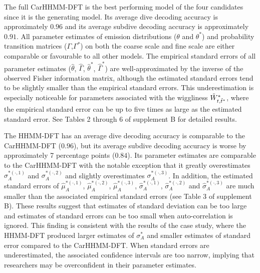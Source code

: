The full CarHHMM-DFT is the best performing model of the four candidates since it is the generating model. Its average dive decoding accuracy is approximately $0.96$ and its average subdive decoding accuracy is approximately $0.91$. 
All parameter estimates of emission distributions ($\theta$ and $\theta^*$) and probability transition matrices ($\Gamma$,$\Gamma^*$) on both the coarse scale and fine scale are either comparable or favourable to all other models. The empirical standard errors of all parameter estimates ($\hat \theta$, $\hat \Gamma$, $\hat \theta^*$, $\hat \Gamma^*$) are well-approximated by the inverse of the observed Fisher information matrix, although the estimated standard errors tend to be slightly smaller than the empirical standard errors. This underestimation is especially noticeable for parameters associated with the wiggliness $\tilde{W}^*_{t,\tilde t^*}$, where the empirical standard error can be up to five times as large as the estimated standard error. See Tables 2 through 6 of supplement B for detailed results.

The HHMM-DFT has an average dive decoding accuracy is comparable to the CarHHMM-DFT ($0.96$), but its average subdive decoding accuracy is worse by approximately 7 percentage points ($0.84$). Its parameter estimates are comparable to the CarHHMM-DFT with the notable exception that it greatly overestimates $\sigma_A^{*(\cdot,1)}$ and $\sigma_A^{*(\cdot,2)}$ and slightly overestimates $\sigma_A^{*(\cdot,3)}$. In addition, the estimated standard errors of $\hat \mu_A^{*(\cdot,1)}$, $\hat \mu_A^{*(\cdot,2)}$, $\hat \mu_A^{*(\cdot,3)}$, $\hat \sigma_A^{*(\cdot,1)}$, $\hat \sigma_A^{*(\cdot,2)}$ and $\hat \sigma_A^{*(\cdot,3)}$ are much smaller than the associated empirical standard errors (see Table 3 of supplement B). These results suggest that estimates of standard deviation can be too large and estimates of standard errors can be too small when auto-correlation is ignored. This finding is consistent with the results of the case study, where the HHMM-DFT produced larger estimates of $\sigma_A^*$ and smaller estimates of standard error compared to the CarHHMM-DFT. When standard errors are underestimated, the associated confidence intervals are too narrow, implying that researchers may be overconfident in their parameter estimates.

